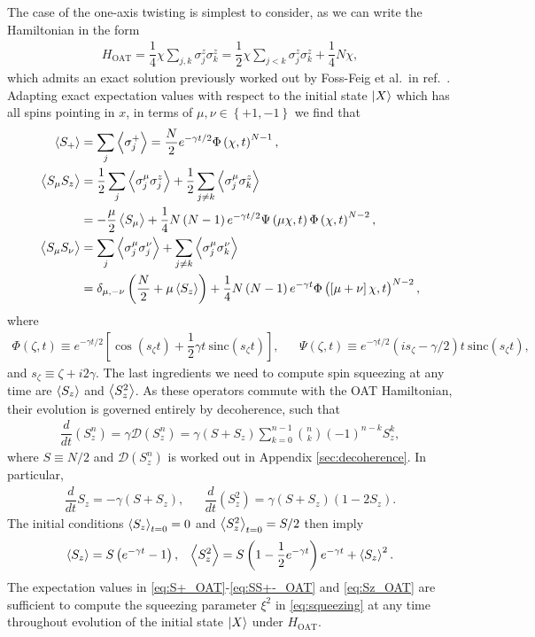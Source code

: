 \documentclass[aps,notitlepage,nofootinbib,11pt]{revtex4-1}
\renewcommand{\t}{\text} %
\newcommand{\f}[2]{\dfrac{#1}{#2}} %
\newcommand{\p}[1]{\left(#1\right)} %
\renewcommand{\sp}[1]{\left[#1\right]} %
\renewcommand{\set}[1]{\left\{#1\right\}} %
\newcommand{\bk}{\Braket} %
\newcommand{\D}{\mathcal{D}}
\newcommand{\1}{\mathds{1}}
\begin{document}
The case of the one-axis twisting is simplest to consider, as we can
write the Hamiltonian in the form
\begin{align}
  H_{\t{OAT}} = \f14 \chi \sum_{j,k} \sigma_j^z \sigma_k^z
  = \f12 \chi \sum_{j<k} \sigma_j^z \sigma_k^z + \f14 N \chi,
\end{align}
which admits an exact solution previously worked out by Foss-Feig et
al.~in ref.~\cite{foss-feig2013nonequilibrium}.  Adapting exact
expectation values with respect to the initial state $\ket{X}$ which
has all spins pointing in $x$, in terms of $\mu,\nu\in\set{+1,-1}$ we
find that
\begin{align}
  \bk{S_+}
  &= \sum_j\bk{\sigma_j^+}
  = \f{N}{2} e^{-\gamma t/2} \Phi\p{\chi,t}^{N-1}, \label{eq:S+_OAT} \\
  \bk{S_\mu S_z}
  &= \f12\sum_j\bk{\sigma_j^\mu\sigma_j^z}
  + \f12\sum_{j\ne k} \bk{\sigma_j^\mu \sigma_k^z} \\
  &= -\f{\mu}{2}\bk{S_\mu} + \f14 N \p{N-1} e^{-\gamma t/2}
  \Psi\p{\mu\chi,t} \Phi\p{\chi,t}^{N-2}, \\
  \bk{S_\mu S_\nu}
  &= \sum_j \bk{\sigma_j^\mu \sigma_j^\nu}
  + \sum_{j\ne k} \bk{\sigma_j^\mu \sigma_k^\nu} \\
  &= \delta_{\mu,-\nu} \p{\f{N}{2} + \mu \bk{S_z}}
  + \f14 N \p{N-1} e^{-\gamma t}
  \Phi\p{\sp{\mu+\nu}\chi,t}^{N-2}, \label{eq:SS+-_OAT}
\end{align}
where
\begin{align}
  \Phi\p{\zeta,t} \equiv e^{-\gamma t/2}
  \sp{\cos\p{s_\zeta t}+\f12\gamma t~\t{sinc}\p{s_\zeta t}},
  &&
  \Psi\p{\zeta,t} \equiv e^{-\gamma t/2}
  \p{is_\zeta-\gamma/2}t~ \t{sinc}\p{s_\zeta t},
\end{align}
and $s_\zeta \equiv \zeta + i2\gamma$.  The last ingredients we need
to compute spin squeezing at any time are $\bk{S_z}$ and $\bk{S_z^2}$.
As these operators commute with the OAT Hamiltonian, their evolution
is governed entirely by decoherence, such that
\begin{align}
  \f{d}{dt}\p{S_z^n}
  = \gamma \D\p{S_z^n}
  = \gamma \p{S + S_z} \sum_{k=0}^{n-1}
  { n \choose k } \p{-1}^{n-k} S_z^k,
\end{align}
where $S\equiv N/2$ and $\D\p{S_z^n}$ is worked out in Appendix
\ref{sec:decoherence}.  In particular,
\begin{align}
  \f{d}{dt} S_z = -\gamma \p{S + S_z},
  &&
  \f{d}{dt}\p{S_z^2} = \gamma \p{S + S_z} \p{1 - 2S_z}.
\end{align}
The initial conditions $\bk{S_z}_{t=0}=0$ and $\bk{S_z^2}_{t=0}=S/2$
then imply
\begin{align}
  \bk{S_z} = S\p{e^{-\gamma t}-1},
  &&
  \bk{S_z^2} = S \p{1 - \f12 e^{-\gamma t}} e^{-\gamma t} + \bk{S_z}^2.
  \label{eq:Sz_OAT}
\end{align}
The expectation values in \eqref{eq:S+_OAT}-\eqref{eq:SS+-_OAT} and
\eqref{eq:Sz_OAT} are sufficient to compute the squeezing parameter
$\xi^2$ in \eqref{eq:squeezing} at any time throughout evolution of
the initial state $\ket{X}$ under $H_{\t{OAT}}$.
\end{document}
